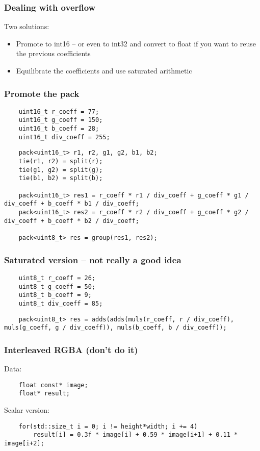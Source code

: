 \documentclass{beamer}
\begin{document}
\begin{frame}
	\frametitle{Dealing with overflow}
	
	Two solutions:
	\begin{itemize}
		\item Promote to int16 -- or even to int32 and convert to float if you want to reuse the previous coefficients
		\item Equilibrate the coefficients and use saturated arithmetic
	\end{itemize} 	

\end{frame}

\begin{frame}[fragile]
	\frametitle{Promote the pack}
	
	\begin{lstlisting}
	uint16_t r_coeff = 77;
	uint16_t g_coeff = 150;
	uint16_t b_coeff = 28;
	uint16_t div_coeff = 255;
	\end{lstlisting}
	
	\begin{lstlisting}	
	pack<uint16_t> r1, r2, g1, g2, b1, b2;
	tie(r1, r2) = split(r);
	tie(g1, g2) = split(g);
	tie(b1, b2) = split(b);
	
	pack<uint16_t> res1 = r_coeff * r1 / div_coeff + g_coeff * g1 / div_coeff + b_coeff * b1 / div_coeff;
	pack<uint16_t> res2 = r_coeff * r2 / div_coeff + g_coeff * g2 / div_coeff + b_coeff * b2 / div_coeff;
	
	pack<uint8_t> res = group(res1, res2);
	\end{lstlisting}
	
\end{frame}

\begin{frame}[fragile]
	\frametitle{Saturated version -- not really a good idea}
	
	\begin{lstlisting}
	uint8_t r_coeff = 26;
	uint8_t g_coeff = 50;
	uint8_t b_coeff = 9;
	uint8_t div_coeff = 85;
	\end{lstlisting}
	
	\begin{lstlisting}
	pack<uint8_t> res = adds(adds(muls(r_coeff, r / div_coeff), muls(g_coeff, g / div_coeff)), muls(b_coeff, b / div_coeff));
	\end{lstlisting}
	
\end{frame}

\begin{frame}[fragile]
	\frametitle{Interleaved RGBA (don't do it)}
	
	Data:
	\begin{lstlisting}
	float const* image;
	float* result;
	\end{lstlisting}
	\bigskip	
	
	Scalar version:
	\begin{lstlisting}
	for(std::size_t i = 0; i != height*width; i += 4)
	    result[i] = 0.3f * image[i] + 0.59 * image[i+1] + 0.11 * image[i+2];
	\end{lstlisting}
	
\end{frame}
\end{document}
